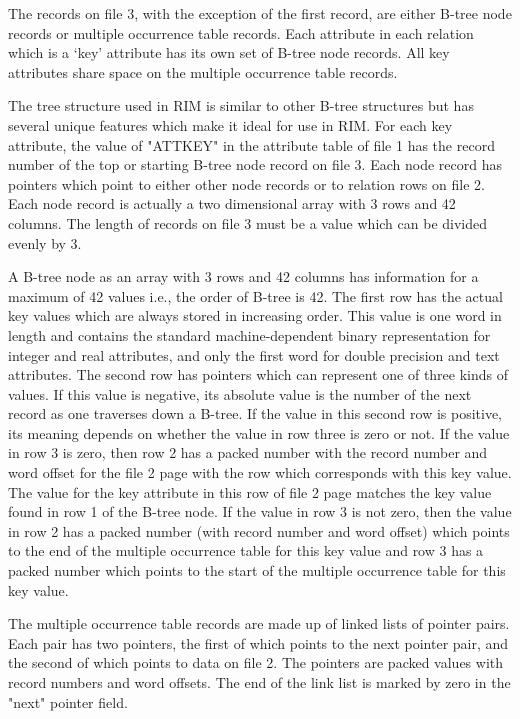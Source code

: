 \documentclass[11pt,a4paper]{report}
\begin{document}
 
The records on file 3, with the exception of the first  record,  are
either  B-tree  node  records  or multiple occurrence table records.
Each attribute in each relation which is a `key' attribute  has  its
own  set  of B-tree node records.  All key attributes share space on
the multiple occurrence table records.
 
The tree structure used in RIM is similar to other B-tree structures
but  has several unique features which make it ideal for use in RIM.
For each key attribute, the value of "ATTKEY" in the attribute table
of  file  1 has the record number of the top or starting B-tree node
record on file 3.  Each node record  has  pointers  which  point  to
either  other node records or to relation rows on file 2.  Each node
record is actually a two  dimensional  array  with  3  rows  and  42
columns.   The length of records on file 3 must be a value which can
be divided evenly by 3.
 
A B-tree node as an array with 3 rows and 42 columns has information
for  a  maximum  of  42 values i.e., the order of B-tree is 42.  The
first row has the actual key  values  which  are  always  stored  in
increasing order.  This value is one word in length and contains the
standard machine-dependent binary  representation  for  integer  and
real  attributes, and only the first word for double precision
and text attributes.
The second row has pointers  which  can  represent
one  of  three  kinds  of  values.   If  this value is negative, its
absolute value is the number of the next  record  as  one  traverses
down  a  B-tree.   If  the value in this second row is positive, its
meaning depends on whether the value in row three is  zero  or  not.
If the value in row 3 is zero, then row 2 has a packed number with
the record number and word offset for the file 2 page with  the  row
which  corresponds  with  this  key  value.   The  value for the key
attribute in this row of file 2 page matches the key value found  in
row  1  of the B-tree node.  If the value in row 3 is not zero, then
the value in row 2 has a packed number  (with  record  number  and
word  offset)  which  points to the end of the multiple occurrence
table for this key value and row  3  has  a  packed  number  which
points  to the start of the multiple occurrence table for this key
value.
 
The multiple occurrence table records are made up of linked lists of
pointer  pairs.   Each  pair  has  two  pointers, the first of which
points to the next pointer pair, and the second of which  points  to
data  on  file  2.   The  pointers  are  packed values with record
numbers and word offsets.  The end of the link  list  is  marked  by
zero in the "next" pointer field.
 
\end{document}
